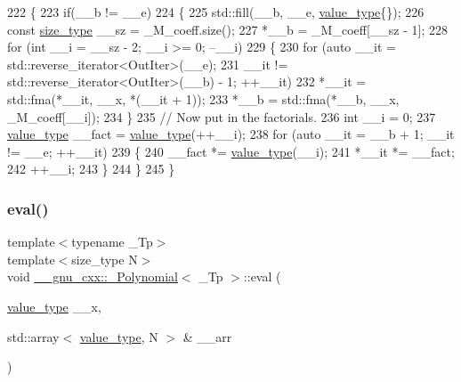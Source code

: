 \begin{DoxyCode}
222       \{
223         \textcolor{keywordflow}{if}(\_\_b != \_\_e)
224           \{
225             std::fill(\_\_b, \_\_e, \hyperlink{class____gnu__cxx_1_1__Polynomial_a725563351f50e76084a7a016c06f8a53}{value\_type}\{\});
226             \textcolor{keyword}{const} \hyperlink{class____gnu__cxx_1_1__Polynomial_a8b25fcfd4acaad0c5c08b649c22da28a}{size\_type} \_\_sz = \_M\_coeff.size();
227             *\_\_b = \_M\_coeff[\_\_sz - 1];
228             \textcolor{keywordflow}{for} (\textcolor{keywordtype}{int} \_\_i = \_\_sz - 2; \_\_i >= 0; --\_\_i)
229               \{
230                 \textcolor{keywordflow}{for} (\textcolor{keyword}{auto} \_\_it = std::reverse\_iterator<OutIter>(\_\_e);
231                      \_\_it != std::reverse\_iterator<OutIter>(\_\_b) - 1; ++\_\_it)
232                   *\_\_it = std::fma(*\_\_it, \_\_x, *(\_\_it + 1));
233                 *\_\_b = std::fma(*\_\_b, \_\_x, \_M\_coeff[\_\_i]);
234               \}
235             \textcolor{comment}{//  Now put in the factorials.}
236             \textcolor{keywordtype}{int} \_\_i = 0;
237             \hyperlink{class____gnu__cxx_1_1__Polynomial_a725563351f50e76084a7a016c06f8a53}{value\_type} \_\_fact = \hyperlink{class____gnu__cxx_1_1__Polynomial_a725563351f50e76084a7a016c06f8a53}{value\_type}(++\_\_i);
238             \textcolor{keywordflow}{for} (\textcolor{keyword}{auto} \_\_it = \_\_b + 1; \_\_it != \_\_e; ++\_\_it)
239               \{
240                 \_\_fact *= \hyperlink{class____gnu__cxx_1_1__Polynomial_a725563351f50e76084a7a016c06f8a53}{value\_type}(\_\_i);
241                 *\_\_it *= \_\_fact;
242                 ++\_\_i;
243               \}
244           \}
245       \}
\end{DoxyCode}
\mbox{\label{class____gnu__cxx_1_1__Polynomial_a3c3b539828301eef5385bc5b230a844a}} 
\subsubsection{\texorpdfstring{eval()}{eval()}\hspace{0.1cm}{\footnotesize\ttfamily [3/4]}}
{\footnotesize\ttfamily template$<$typename \+\_\+\+Tp$>$ \\
template$<$size\+\_\+type N$>$ \\
void \hyperlink{class____gnu__cxx_1_1__Polynomial}{\+\_\+\+\_\+gnu\+\_\+cxx\+::\+\_\+\+Polynomial}$<$ \+\_\+\+Tp $>$\+::eval (\begin{DoxyParamCaption}\item[{\hyperlink{class____gnu__cxx_1_1__Polynomial_a725563351f50e76084a7a016c06f8a53}{value\+\_\+type}}]{\+\_\+\+\_\+x,  }\item[{std\+::array$<$ \hyperlink{class____gnu__cxx_1_1__Polynomial_a725563351f50e76084a7a016c06f8a53}{value\+\_\+type}, N $>$ \&}]{\+\_\+\+\_\+arr }\end{DoxyParamCaption})}

